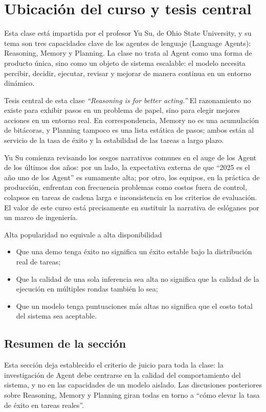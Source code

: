 \section{Ubicación del curso y tesis central}

Esta clase está impartida por el profesor Yu Su, de Ohio State University, y su tema son tres capacidades clave de los agentes de lenguaje (Language Agents): Reasoning, Memory y Planning. La clase no trata al Agent como una forma de producto única, sino como un objeto de sistema escalable: el modelo necesita percibir, decidir, ejecutar, revisar y mejorar de manera continua en un entorno dinámico.

\begin{importantbox}{Tesis central de esta clase}
\textit{``Reasoning is for better acting.''} El razonamiento no existe para exhibir pasos en un problema de papel, sino para elegir mejores acciones en un entorno real. En correspondencia, Memory no es una acumulación de bitácoras, y Planning tampoco es una lista estática de pasos; ambos están al servicio de la tasa de éxito y la estabilidad de las tareas a largo plazo.
\end{importantbox}

Yu Su comienza revisando los sesgos narrativos comunes en el auge de los Agent de los últimos dos años: por un lado, la expectativa externa de que ``2025 es el año uno de los Agent'' es sumamente alta; por otro, los equipos, en la práctica de producción, enfrentan con frecuencia problemas como costos fuera de control, colapsos en tareas de cadena larga e inconsistencia en los criterios de evaluación. El valor de este curso está precisamente en sustituir la narrativa de eslóganes por un marco de ingeniería.

\begin{warningbox}{Alta popularidad no equivale a alta disponibilidad}
\begin{itemize}
    \item Que una demo tenga éxito no significa un éxito estable bajo la distribución real de tareas;
    \item Que la calidad de una sola inferencia sea alta no significa que la calidad de la ejecución en múltiples rondas también lo sea;
    \item Que un modelo tenga puntuaciones más altas no significa que el costo total del sistema sea aceptable.
\end{itemize}
\end{warningbox}

\subsection{Resumen de la sección}
Esta sección deja establecido el criterio de juicio para toda la clase: la investigación de Agent debe centrarse en la calidad del comportamiento del sistema, y no en las capacidades de un modelo aislado. Las discusiones posteriores sobre Reasoning, Memory y Planning giran todas en torno a ``cómo elevar la tasa de éxito en tareas reales''.
